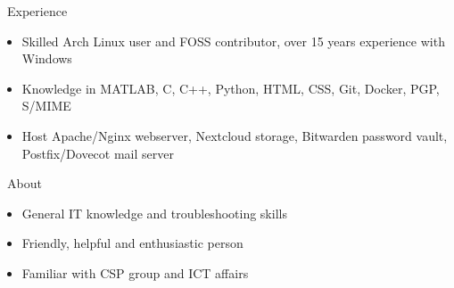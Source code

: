 \documentclass{resume}
\begin{document}
\begin{section}{\faTasks\ Experience}
	\begin{itemize}[noitemsep,nolistsep]
		\item Skilled Arch Linux user and FOSS contributor, over 15 years experience with Windows
		\item Knowledge in MATLAB, C, C++, Python, HTML, CSS, Git, Docker, PGP, S/MIME
		\item Host Apache/Nginx webserver, Nextcloud storage, Bitwarden password vault, Postfix/Dovecot mail server
	\end{itemize}
\end{section}

\begin{section}{\faHeartO\ About}
	\begin{itemize}[noitemsep,nolistsep]
		\item General IT knowledge and troubleshooting skills
		\item Friendly, helpful and enthusiastic person
		\item Familiar with CSP group and ICT affairs
	\end{itemize}
\end{section}

\end{document}
